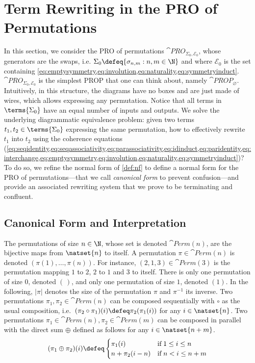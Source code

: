
\section{Term Rewriting in the PRO of Permutations}\label{sec:perm}

In this section, we consider the PRO of permutations $\cat{PRO}_{\Sigma_0,\mathcal{E}_0}$, whose generators are the swaps, i.e. $\Sigma_0\defeq\{\sigma_{n,m}:n,m\in\N\}$ and where $\mathcal{E}_0$ is the set containing \cref{eq:emptysymmetry,eq:involution,eq:naturality,eq:symmetryinduct}. $\cat{PRO}_{\Sigma_0,\mathcal{E}_0}$ is the simplest PROP that one can think about, namely $\cat{PROP}_\varnothing$. Intuitively, in this structure, the diagrams have no boxes and are just made of wires, which allows expressing any permutation. Notice that all terms in $\terms{\Sigma_0}$ have an equal number of inputs and outputs. We solve the underlying diagrammatic equivalence problem: given two terms $t_1,t_2\in\terms{\Sigma_0}$ expressing the same permutation, how to effectively rewrite $t_1$ into $t_2$ using the coherence equations (\cref{eq:seqidentity,eq:seqassociativity,eq:parassociativity,eq:idinduct,eq:paridentity,eq:interchange,eq:emptysymmetry,eq:involution,eq:naturality,eq:symmetryinduct})? To do so, we refine the normal form of \cref{def:nf} to define a normal form for the PRO of permutations---that we call \emph{canonical form} to prevent confusion---and provide an associated rewriting system that we prove to be terminating and confluent.


\subsection{Canonical Form and Interpretation}

The permutations of size $n\in\N$, whose set is denoted $\cat{Perm}(n)$, are the bijective maps from $\natset{n}$ to itself. A permutation ${\pi\in\cat{Perm}(n)}$ is denoted $(\pi(1),\dots,\pi(n))$. For instance, ${(2,1,3)\in\cat{Perm}(3)}$ is the permutation mapping $1$ to $2$, $2$ to $1$ and $3$ to itself. There is only one permutation of size $0$, denoted $(\,)$, and only one permutation of size $1$, denoted $(1)$. In the following, $|\pi|$ denotes the size of the permutation $\pi$ and $\pi^{-1}$ its inverse. Two permutations $\pi_1,\pi_2\in\cat{Perm}(n)$ can be composed sequentially with $\circ$ as the usual composition, i.e.~$(\pi_2\circ\pi_1)(i)\defeq\pi_2(\pi_1(i))$ for any $i\in\natset{n}$. Two permutations $\pi_1\in\cat{Perm}(n),\pi_2\in\cat{Perm}(m)$ can be composed in parallel with the direct sum $\oplus$ defined as follows for any $i\in\natset{n+m}$.
\begin{gather*}
    (\pi_1\oplus\pi_2)(i)\defeq\begin{cases}
        \pi_1(i) &\text{if}\; 1\le i\le n\\
        n+\pi_2(i-n) &\text{if}\; n<i\le n+m
    \end{cases}
\end{gather*}

